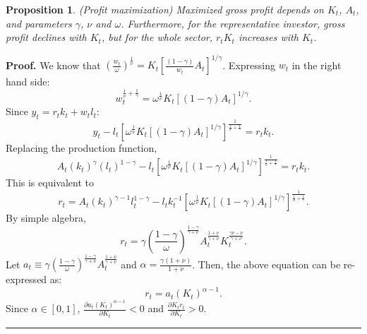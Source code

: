 \documentclass[12pt]{article}%
\newtheorem{proposition}{Proposition}
\newenvironment{proof}[1][Proof]{\noindent\textbf{#1.} }{\ \rule{0.5em}{0.5em}}
\begin{document}
\begin{proposition} (Profit maximization) Maximized gross profit depends on
$K_t$, $A_t$, and parameters $\gamma$, $\nu$ and $\omega$. Furthermore, for the
representative investor, gross profit declines with $K_t$, but for the whole
sector, $r_t K_t$ increases with $K_t$.
\end{proposition}

\begin{proof}
We know that $(\frac{w_t}{\omega})^{\frac{1}{\nu}}=  K_t
[\frac{(1-\gamma)}{w_t}A_t]^{1/\gamma}$. Expressing $w_t$ in the right hand
side:
\begin{equation}
w_t^{\frac{1}{\nu}+\frac{1}{\gamma}} = \omega^{\frac{1}{\nu}} K_t
[(1-\gamma)A_t]^{1/\gamma}.
\end{equation}
Since $y_t = r_t k_t + w_t l_t$:
\begin{equation}
y_t - l_t[\omega^{\frac{1}{\nu}} K_t
[(1-\gamma)A_t]^{1/\gamma}]^{\frac{1}{\frac{1}{\nu}+\frac{1}{\gamma}}}=r_tk_t.
\end{equation}
Replacing the production function,
\begin{equation}
A_t(k_t)^{\gamma}(l_t)^{1-\gamma} - l_t[\omega^{\frac{1}{\nu}} K_t
[(1-\gamma)A_t]^{1/\gamma}]^{\frac{1}{\frac{1}{\nu}+\frac{1}{\gamma}}}=r_tk_t.
\end{equation}
This is equivalent to
\begin{equation}
r_t =A_t(k_t)^{\gamma -1}l_t^{1-\gamma}- l_t k_t^{-1}[\omega^{\frac{1}{\nu}} K_t
[(1-\gamma)A_t]^{1/\gamma}]^{\frac{1}{\frac{1}{\nu}+\frac{1}{\gamma}}}.
\end{equation}
By simple algebra,
\begin{equation}
r_t = \gamma (\frac{1-\gamma}{\omega})^{\frac{1-\gamma}{\gamma + \nu}} A_t^{\frac{1+\nu}{\gamma+\nu}}
K_t^{\frac{\gamma \nu -\nu}{\gamma+\nu}}.
\end{equation}
Let $a_t \equiv \gamma (\frac{1-\gamma}{\omega})^{\frac{1-\gamma}{\gamma + \nu}}
A_t^{\frac{1+\nu}{\gamma+\nu}}$ and $\alpha = \frac{\gamma (1+\nu)}{1+\nu}$.
Then, the above equation can be re-expressed as:
\begin{equation}
r_t = a_t (K_t)^{\alpha -1}.
\end{equation}
Since $\alpha \in [0,1]$, $\frac{\partial a_t(K_t)^{\alpha -1}}{\partial K_t}
< 0$ and $\frac{\partial K_t r_t}{\partial K_t} > 0$. \end{proof}
\end{document}
